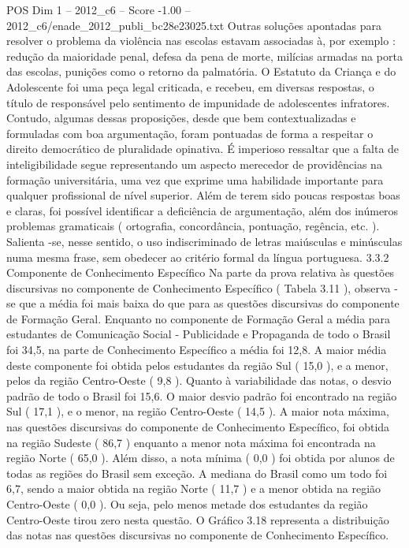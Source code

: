 \begin{textsample}{POS Dim 1 – 2012\_c6 – Score -1.00 – 2012\_c6/enade\_2012\_publi\_bc28e23025.txt}
Outras soluções apontadas para resolver o problema da violência nas escolas estavam associadas à, por exemplo : redução da maioridade penal, defesa da pena de morte, milícias armadas na porta das escolas, punições como o retorno da palmatória.
O Estatuto da Criança e do Adolescente foi uma peça legal criticada, e recebeu, em diversas respostas, o título de responsável pelo sentimento de impunidade de adolescentes infratores.
Contudo, algumas dessas proposições, desde que bem contextualizadas e formuladas com boa argumentação, foram pontuadas de forma a respeitar o direito democrático de pluralidade opinativa.
É imperioso ressaltar que a falta de inteligibilidade segue representando um aspecto merecedor de providências na formação universitária, uma vez que exprime uma habilidade importante para qualquer profissional de nível superior.
Além de terem sido poucas respostas boas e claras, foi possível identificar a deficiência de argumentação, além dos inúmeros problemas gramaticais ( ortografia, concordância, pontuação, regência, etc. ).
Salienta -se, nesse sentido, o uso indiscriminado de letras maiúsculas e minúsculas numa mesma frase, sem obedecer ao critério formal da língua portuguesa. 3.3.2 Componente de Conhecimento Específico Na parte da prova relativa às questões discursivas no componente de Conhecimento Específico ( Tabela 3.11 ), observa -se que a média foi mais baixa do que para as questões discursivas do componente de Formação Geral.
Enquanto no componente de Formação Geral a média para estudantes de Comunicação Social - Publicidade e Propaganda de todo o Brasil foi 34,5, na parte de Conhecimento Específico a média foi 12,8.
A maior média deste componente foi obtida pelos estudantes da região Sul ( 15,0 ), e a menor, pelos da região Centro-Oeste ( 9,8 ).
Quanto à variabilidade das notas, o desvio padrão de todo o Brasil foi 15,6.
O maior desvio padrão foi encontrado na região Sul ( 17,1 ), e o menor, na região Centro-Oeste ( 14,5 ).
A maior nota máxima, nas questões discursivas do componente de Conhecimento Específico, foi obtida na região Sudeste ( 86,7 ) enquanto a menor nota máxima foi encontrada na região Norte ( 65,0 ).
Além disso, a nota mínima ( 0,0 ) foi obtida por alunos de todas as regiões do Brasil sem exceção.
A mediana do Brasil como um todo foi 6,7, sendo a maior obtida na região Norte ( 11,7 ) e a menor obtida na região Centro-Oeste ( 0,0 ).
Ou seja, pelo menos metade dos estudantes da região Centro-Oeste tirou zero nesta questão.
O Gráfico 3.18 representa a distribuição das notas nas questões discursivas no componente de Conhecimento Específico.

\end{textsample}
